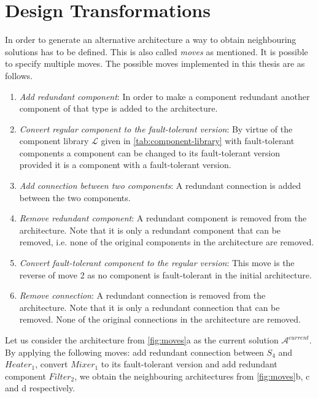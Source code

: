 \section{Design Transformations}
\label{sec:moves}
In order to generate an alternative architecture a way to obtain neighbouring solutions has to be defined. This is also called \emph{moves} as mentioned. It is possible to specify multiple moves. The possible moves implemented in this thesis are as follows.
\begin{enumerate}

\item \emph{Add redundant component}: In order to make a component redundant another component of that type is added to the architecture.

\item \emph{Convert regular component to the fault-tolerant version}: By virtue of the component library $\mathcal{L}$ given in \autoref{tab:component-library} with fault-tolerant components a component can be changed to its fault-tolerant version provided it is a component with a fault-tolerant version.

\item \emph{Add connection between two components}: A redundant connection is added between the two components.

\item \emph{Remove redundant component}: A redundant component is removed from the architecture. Note that it is only a redundant component that can be removed, i.e. none of the original components in the architecture are removed.

\item \emph{Convert fault-tolerant component to the regular version}: This move is the reverse of move 2 as no component is fault-tolerant in the initial architecture.

\item \emph{Remove connection}: A redundant connection is removed from the architecture. Note that it is only a redundant connection that can be removed. None of the original connections in the architecture are removed.

\end{enumerate}

Let us consider the architecture from \autoref{fig:moves}a as the current solution $\mathcal{A}^{current}$. By applying the following moves: add redundant connection between $S_4$ and $Heater_1$, convert $Mixer_1$ to its fault-tolerant version and add redundant component $Filter_2$, we obtain the neighbouring architectures from \autoref{fig:moves}b, c and d respectively.

